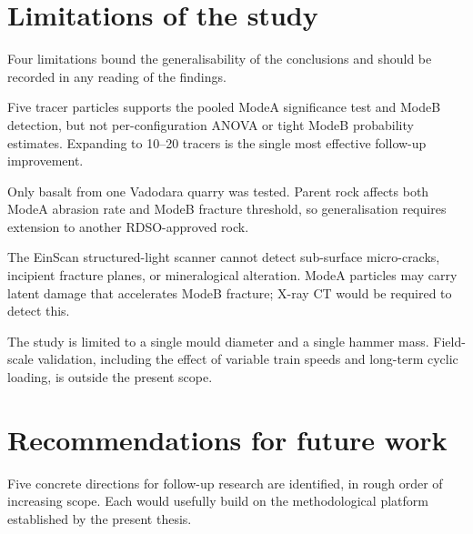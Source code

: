 \section{Limitations of the study}
\label{sec:concl-limitations}

Four limitations bound the generalisability of the conclusions and should
be recorded in any reading of the findings.

\begin{caveat}[title=Limitation 1 -- Sample size per configuration]
Five tracer particles supports the pooled \gls{ModeA} significance test
and \gls{ModeB} detection, but not per-configuration ANOVA or tight
\gls{ModeB} probability estimates. Expanding to \numrange{10}{20}
tracers is the single most effective follow-up improvement.
\end{caveat}

\begin{caveat}[title=Limitation 2 -- Single parent rock type]
Only basalt from one Vadodara quarry was tested. Parent rock affects
both \gls{ModeA} abrasion rate and \gls{ModeB} fracture threshold, so
generalisation requires extension to another \gls{RDSO}-approved rock.
\end{caveat}

\begin{caveat}[title=Limitation 3 -- Surface morphology only]
The EinScan structured-light scanner cannot detect sub-surface
micro-cracks, incipient fracture planes, or mineralogical alteration.
\gls{ModeA} particles may carry latent damage that accelerates
\gls{ModeB} fracture; X-ray CT would be required to detect this.
\end{caveat}

\begin{caveat}[title=Limitation 4 -- Laboratory scale]
The study is limited to a single mould diameter and a single hammer
mass. Field-scale validation, including the effect of variable train
speeds and long-term cyclic loading, is outside the present scope.
\end{caveat}

\section{Recommendations for future work}
\label{sec:concl-future}

Five concrete directions for follow-up research are identified, in rough
order of increasing scope. Each would usefully build on the methodological
platform established by the present thesis.

